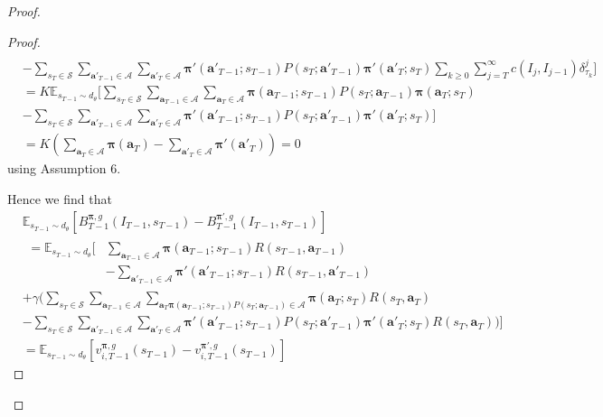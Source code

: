 \documentclass{article}
\begin{document}
\begin{proof}
\begin{proof}
\begin{align}
\\&-\sum_{s_T\in\mathcal{S}}\sum_{\boldsymbol{a'}_{T-1}\in\boldsymbol{\mathcal{A}}}\sum_{\boldsymbol{a'}_{T}\in\boldsymbol{\mathcal{A}}}\boldsymbol{\pi'}(\boldsymbol{a'}_{T-1};s_{T-1})P(s_T;\boldsymbol{a'}_{T-1})\boldsymbol{\pi'}(\boldsymbol{a'}_{T};s_{T})\sum_{k\geq 0}\sum_{j= T}^\infty c(I_j,I_{j-1})\delta^j_{\tau_k}\Bigg]
\\&=K\mathbb{E}_{s_{T-1}\sim d_\theta}\Bigg[\sum_{s_T\in\mathcal{S}}\sum_{\boldsymbol{a}_{T-1}\in\boldsymbol{\mathcal{A}}}\sum_{\boldsymbol{a}_{T}\in\boldsymbol{\mathcal{A}}}\boldsymbol{\pi}(\boldsymbol{a}_{T-1};s_{T-1})P(s_T;\boldsymbol{a}_{T-1})\boldsymbol{\pi}(\boldsymbol{a}_{T};s_{T})
\\&-\sum_{s_T\in\mathcal{S}}\sum_{\boldsymbol{a'}_{T-1}\in\boldsymbol{\mathcal{A}}}\sum_{\boldsymbol{a'}_{T}\in\boldsymbol{\mathcal{A}}}\boldsymbol{\pi'}(\boldsymbol{a'}_{T-1};s_{T-1})P(s_T;\boldsymbol{a'}_{T-1})\boldsymbol{\pi'}(\boldsymbol{a'}_{T};s_{T})\Bigg]
\\&=K\left(\sum_{\boldsymbol{a}_{T}\in\boldsymbol{\mathcal{A}}}\boldsymbol{\pi}(\boldsymbol{a}_{T}) -\sum_{\boldsymbol{a'}_{T}\in\boldsymbol{\mathcal{A}}}\boldsymbol{\pi'}(\boldsymbol{a'}_{T})\right) =0
\end{align}
using Assumption 6.

Hence we find that
\begin{align}\nonumber
&\mathbb{E}_{s_{T-1}\sim d_\theta}\left[B^{\boldsymbol{\pi},g}_{T-1}(I_{T-1},s_{T-1})-B^{\boldsymbol{\pi'},g}_{T-1}(I_{T-1},s_{T-1})\right]
\\&\begin{aligned}=\mathbb{E}_{s_{T-1}\sim d_\theta}\Bigg[&\sum_{\boldsymbol{a}_{T-1}\in\boldsymbol{\mathcal{A}}}\boldsymbol{\pi}(\boldsymbol{a}_{T-1};s_{T-1})R(s_{T-1},\boldsymbol{a}_{T-1})
\\&-\sum_{\boldsymbol{a'}_{T-1}\in\boldsymbol{\mathcal{A}}}\boldsymbol{\pi'}(\boldsymbol{a'}_{T-1};s_{T-1})R(s_{T-1},\boldsymbol{a'}_{T-1})
\end{aligned}
\\&+\gamma \Bigg(\sum_{s_T\in\mathcal{S}}\sum_{\boldsymbol{a}_{T-1}\in\boldsymbol{\mathcal{A}}}\sum_{\boldsymbol{a}_{T}\boldsymbol{\pi}(\boldsymbol{a}_{T-1};s_{T-1})P(s_T;\boldsymbol{a}_{T-1})\in\boldsymbol{\mathcal{A}}}\boldsymbol{\pi}(\boldsymbol{a}_{T};s_{T})
R(s_{T},\boldsymbol{a}_{T})
\\&-\sum_{s_T\in\mathcal{S}}\sum_{\boldsymbol{a'}_{T-1}\in\boldsymbol{\mathcal{A}}}\sum_{\boldsymbol{a'}_{T}\in\boldsymbol{\mathcal{A}}}\boldsymbol{\pi'}(\boldsymbol{a'}_{T-1};s_{T-1})P(s_T;\boldsymbol{a'}_{T-1})\boldsymbol{\pi'}(\boldsymbol{a'}_{T};s_{T})
R(s_{T},\boldsymbol{a}_{T})\Bigg)\Bigg]
\\&=\mathbb{E}_{s_{T-1}\sim d_\theta}\left[v^{\boldsymbol{\pi},g}_{i,T-1}(s_{T-1})-v^{\boldsymbol{\pi'},g}_{i,T-1}(s_{T-1})\right]
\end{align}


\end{proof}
\end{proof}
\end{document}
